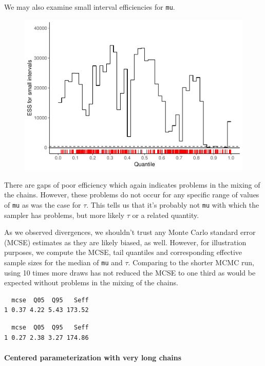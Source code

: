 \documentclass[american,]{article}
\let\oldparagraph\paragraph
\renewcommand{\paragraph}[1]{\oldparagraph{#1}\mbox{}}
\begin{document}
We may also examine small interval efficiencies for \texttt{mu}.

\begin{figure}[tp]
  \centering
  \includegraphics[width=0.6\linewidth]{graphics/local-ess-fit-cp2-mu-1.pdf}
\end{figure}

There are gaps of poor efficiency which again indicates problems in the
mixing of the chains. However, these problems do not occur for any
specific range of values of \texttt{mu} as was the case for
$\tau$. This tells us that it's probably not \texttt{mu} with
which the sampler has problems, but more likely $\tau$ or a
related quantity.

As we observed divergences, we shouldn't trust any Monte Carlo standard
error (MCSE) estimates as they are likely biased, as well. However, for
illustration purposes, we compute the MCSE, tail quantiles and
corresponding effective sample sizes for the median of \texttt{mu} and
$\tau$. Comparing to the shorter MCMC run, using 10 times more
draws has not reduced the MCSE to one third as would be expected without
problems in the mixing of the chains.

\begin{verbatim}
  mcse  Q05  Q95   Seff
1 0.37 4.22 5.43 173.52
\end{verbatim}

\begin{verbatim}
  mcse  Q05  Q95   Seff
1 0.27 2.38 3.27 174.86
\end{verbatim}

\hypertarget{centered-parameterization-with-very-long-chains}{%
\paragraph{Centered parameterization with very long
chains}\label{centered-parameterization-with-very-long-chains}}
\end{document}
